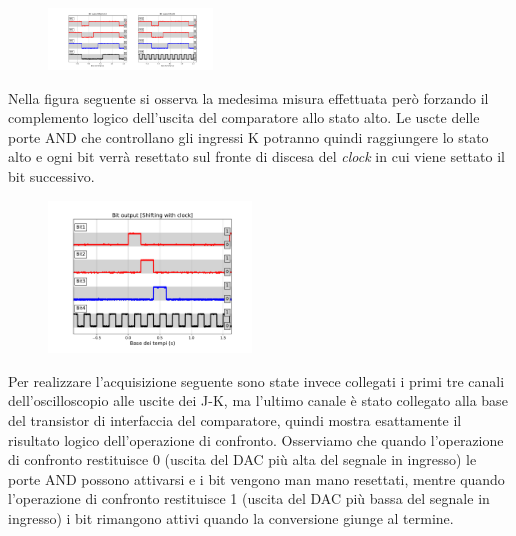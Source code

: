 \documentclass[journal]{IEEEtran}
\begin{document}
\vspace{-10mm}

\begin{figure}[H]%
\begin{center}
\includegraphics[trim = {600 0 100 0}, clip, width=0.39\textwidth]{analysis/output/cumulative_BIT.pdf}
\label{fig:cumulative_BIT_clk}
\end{center}
\end{figure}

\vspace{-7mm}

Nella figura seguente si osserva la medesima misura effettuata però forzando il complemento logico dell'uscita del comparatore allo stato alto. Le uscte delle porte AND che controllano gli ingressi K potranno quindi raggiungere lo stato alto e ogni bit verrà resettato sul fronte di discesa del \textit{clock} in cui viene settato il bit successivo.

\begin{figure}[H]%
\begin{center}
\includegraphics[width=0.48\textwidth]{analysis/output/BIT-shift-clk.pdf}
\label{fig:BIT_shift_clk}
\end{center}
\end{figure}

Per realizzare l'acquisizione seguente sono state invece collegati i primi tre canali dell'oscilloscopio alle uscite dei J-K, ma l'ultimo canale è stato collegato alla base del transistor di interfaccia del comparatore, quindi mostra esattamente il risultato logico dell'operazione di confronto. Osserviamo che quando l'operazione di confronto restituisce 0 (uscita del DAC più alta del segnale in ingresso) le porte AND possono attivarsi e i bit vengono man mano resettati, mentre quando l'operazione di confronto restituisce 1 (uscita del DAC più bassa del segnale in ingresso) i bit rimangono attivi quando la conversione giunge al termine.
\end{document}
